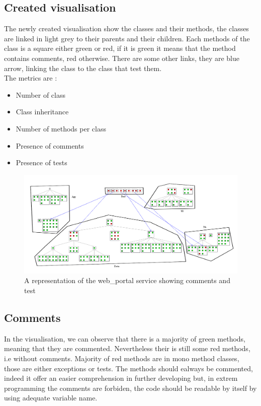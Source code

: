 \documentclass[a4paper,10pt]{article}
\begin{document}
\subsection{Created visualisation}
The newly created visualisation show the classes and their methods, the classes are linked in light grey to their parents and their children. Each methods of the class is a square either green or red, if it is green it means that the method contains comments, red otherwise. There are some other links, they are blue arrow, linking the class to the class that test them.\\
The metrics are :
\begin{itemize}
\item Number of class
\item Class inheritance
\item Number of methods per class
\item Presence of comments
\item Presence of tests
\end{itemize}
\begin{figure}[h]
\includegraphics[width=\textwidth]{src/tc2.png}
\caption{A representation of the web\_portal service showing comments and test}
\end{figure}
\subsection{Comments}
In the visualisation, we can observe that there is a majority of green methods, meaning that they are commented. Nevertheless their is still some red methods, i.e without comments. Majority of red methods are in mono method classes, those are either exceptions or tests. The methods should ealways be commented, indeed it offer an easier comprehension in further developing but, in extrem programming the comments are forbiden, the code should be readable by itself by using adequate variable name.
\end{document}
